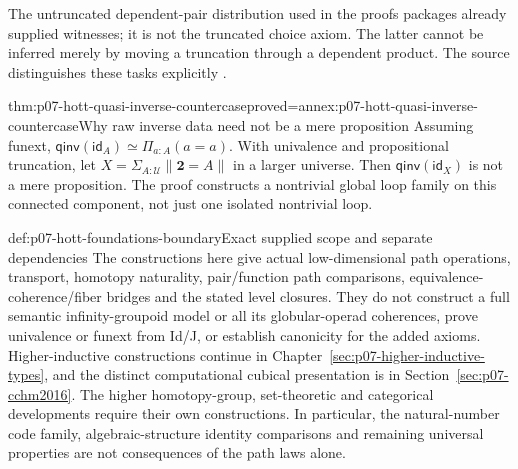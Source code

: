 The untruncated dependent-pair distribution used in the proofs packages
already supplied witnesses; it is not the truncated choice axiom.
The latter cannot be inferred merely by moving a truncation through a
dependent product. The source distinguishes these tasks explicitly
\parencite[\S3.4--3.10]{HoTT2013PublicReleaseFoundations}.

\begin{hbtheorem}{thm:p07-hott-quasi-inverse-countercase}{proved=annex:p07-hott-quasi-inverse-countercase}{Why raw inverse data need not be a mere proposition}
Assuming funext,
$\mathsf{qinv}(\mathsf{id}_A)\simeq\Pi_{a:A}(a=a)$.
With univalence and propositional truncation, let
$X=\Sigma_{A:\mathcal U}\|\mathbf2=A\|$ in a larger universe.
Then $\mathsf{qinv}(\mathsf{id}_X)$ is not a mere proposition.
The proof constructs a nontrivial global loop family on this connected
component, not just one isolated nontrivial loop.
\end{hbtheorem}

\begin{proofboundary}{def:p07-hott-foundations-boundary}{Exact supplied scope and separate dependencies}
The constructions here give actual low-dimensional path operations,
transport, homotopy naturality, pair/function path comparisons,
equivalence-coherence/fiber bridges and the stated level closures.
They do not construct a full semantic infinity-groupoid model or all its
globular-operad coherences, prove univalence or funext from Id/J, or
establish canonicity for the added axioms. Higher-inductive constructions
continue in Chapter~\ref{sec:p07-higher-inductive-types}, and the distinct
computational cubical presentation is in Section~\ref{sec:p07-cchm2016}.
The higher homotopy-group, set-theoretic and categorical developments
require their own constructions. In particular, the natural-number code
family, algebraic-structure identity comparisons and remaining universal
properties are not consequences of the path laws alone.
\end{proofboundary}

